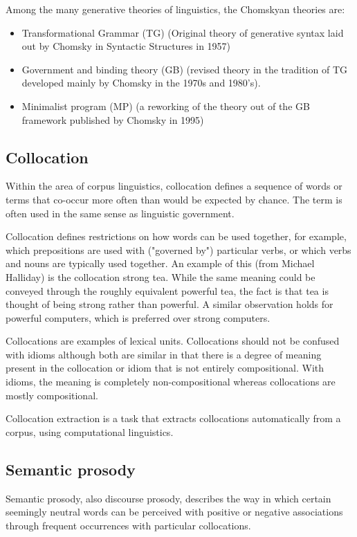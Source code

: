 Among the many generative theories of linguistics, the Chomskyan theories are:
\begin{itemize}
  \item Transformational Grammar (TG) (Original theory of generative syntax laid out by Chomsky in Syntactic Structures in 1957)
  \item Government and binding theory (GB) (revised theory in the tradition of TG developed mainly by Chomsky in the 1970s and 1980's).
  \item Minimalist program (MP) (a reworking of the theory out of the GB framework published by Chomsky in 1995)
\end{itemize}



\subsection{Collocation} Within the area of corpus linguistics, collocation defines a sequence of words or terms that co-occur more often than would be expected by chance. The term is often used in the same sense as linguistic government.

Collocation defines restrictions on how words can be used together, for example, which prepositions are used with ("governed by") particular verbs, or which verbs and nouns are typically used together. An example of this (from Michael Halliday) is the collocation strong tea. While the same meaning could be conveyed through the roughly equivalent powerful tea, the fact is that tea is thought of being strong rather than powerful. A similar observation holds for powerful computers, which is preferred over strong computers.

Collocations are examples of lexical units. Collocations should not be confused with idioms although both are similar in that there is a degree of meaning present in the collocation or idiom that is not entirely compositional. With idioms, the meaning is completely non-compositional whereas collocations are mostly compositional.

Collocation extraction is a task that extracts collocations automatically from a corpus, using computational linguistics.

\subsection{Semantic prosody} Semantic prosody, also discourse prosody, describes the way in which certain seemingly neutral words can be perceived with positive or negative associations through frequent occurrences with particular collocations.

